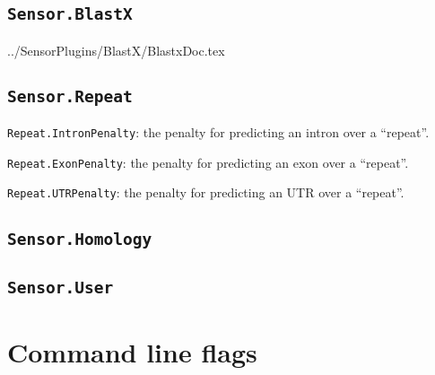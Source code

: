 \documentclass[a4paper,titlepage]{report}
\begin{document}
\subsection{\texttt{Sensor.BlastX}}
 {../SensorPlugins/BlastX/BlastxDoc.tex}


\subsection{\texttt{Sensor.Repeat}}

\texttt{Repeat.IntronPenalty}: the penalty for predicting an
  intron over a ``repeat''.

\texttt{Repeat.ExonPenalty}: the penalty for predicting an
  exon over a ``repeat''.

\texttt{Repeat.UTRPenalty}: the penalty for predicting an
  UTR over a ``repeat''.

\subsection{\texttt{Sensor.Homology}}


\subsection{\texttt{Sensor.User}}
\label{pluguser}

\section{Command line flags}
 
\end{document}
